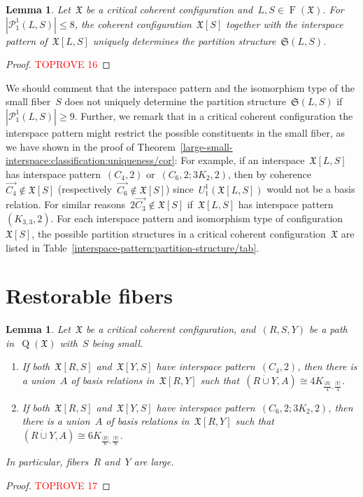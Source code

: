 \documentclass[english,a4paper]{article}
\theoremstyle{plain}
\newtheorem{lemma}      [theorem]{Lemma}
\theoremstyle{definition}
\newcommand{\abs}[1]{| #1 |}
\newcommand{\disjointUnion}{\ensuremath{\mathbin{\dot{\cup}}}}
\DeclareMathOperator{\Fibers}{F}
\newcommand{\coherentConfig}{\ensuremath{\mathfrak{X}}}
\newcommand{\fibers}[1]{\ensuremath{\Fibers \left( #1 \right)}}
\newcommand{\interspace}[2]{\ensuremath{\coherentConfig[#1,#2]}}
\newcommand{\inducedCC}[1]{\ensuremath{\coherentConfig[#1]}}
\newcommand{\arcs}{\ensuremath{A}}
\DeclareMathOperator*{\Quotient}{Q}
\newcommand{\quotientGraph}[1]{\ensuremath{\Quotient(#1)}}
\newcommand{\partition}[1]{\ensuremath{\mathcal{P}^1_1(#1)}}
\newcommand{\partitionStructure}[1]{\ensuremath{\mathfrak{S}(#1)}}
\newcommand{\ipfourCycle}   {\ensuremath{(\cycle{4},2)}}
\newcommand{\ipsixMatchingAndCycle}     {\ensuremath{(\cycle{6},2;\disjointCliques{3}{2},2)}}
\newcommand{\ipsixTriangleComplement}     {\ensuremath{(\clique{3,3},2)}}
\newcommand{\clique}[1]{\ensuremath{K_{#1}}}
\newcommand{\cycle}[1]{\ensuremath{C_{#1}}}
\newcommand{\disjointCliques}[2]{\ensuremath{#1 \clique{#2}}}
\begin{document}
\begin{lemma}
\label{interspace-pattern:partition-structure/lem}
    Let~$\coherentConfig$ be a critical coherent configuration and~$L,S \in \fibers{\coherentConfig}$.
    For~$|\partition{L,S}| \leq 8$, the coherent configuration~$\inducedCC{S}$ together with the interspace pattern of~$\interspace{L}{S}$ uniquely determines the partition structure~$\partitionStructure{L,S}$.
\end{lemma}
\begin{proof}\textcolor{red}{TOPROVE 16}\end{proof}


We should comment that the interspace pattern and the isomorphism type of the small fiber~$S$ does not uniquely determine the partition structure~$\partitionStructure{L,S}$ if~$|\partition{L,S}| \geq 9$.
Further, we remark that in a critical coherent configuration the interspace pattern might restrict the possible constituents in the small fiber, as we have shown in the proof of Theorem~\ref{large-small-interspace:classification:uniqueness/cor}:
For example, if an interspace~$\interspace{L}{S}$ has interspace pattern~$\ipfourCycle$ or~$\ipsixMatchingAndCycle$, then by coherence~$\overrightarrow{C_4} \notin \inducedCC{S}$ (respectively~$\overrightarrow{C_6} \notin \inducedCC{S}$) since~$U^1_1(\interspace{L}{S})$ would not be a basis relation.
For similar reasons~$2\overrightarrow{C_3} \notin \inducedCC{S}$ if~$\interspace{L}{S}$ has interspace pattern~$\ipsixTriangleComplement$.
For each interspace pattern and isomorphism type of configuration~$\inducedCC{S}$, the possible partition structures in a critical coherent configuration~$\coherentConfig$ are listed in Table~\ref{interspace-pattern:partition-structure/tab}.
     

\section{Restorable fibers}
\label{critical:restorable/sec}


\begin{lemma}
    \label{critical:adjacent-interspace-cycle/lem}
    Let~$\coherentConfig$ be a critical coherent configuration, and~$(R,S,Y)$ be a path in~$\quotientGraph{\coherentConfig}$ with~$S$ being small.
    \begin{enumerate}
        \item If both~$\interspace{R}{S}$ and~$\interspace{Y}{S}$ have interspace pattern~$\ipfourCycle$, then there is a union~$\arcs$ of basis relations in~$\interspace{R}{Y}$ such that~$(R \disjointUnion Y,\arcs) \cong \disjointCliques{4}{\frac{\abs{R}}{4},\frac{\abs{Y}}{4}}$.
        \item If both~$\interspace{R}{S}$ and~$\interspace{Y}{S}$ have interspace pattern~$\ipsixMatchingAndCycle$, then there is a union~$\arcs$ of basis relations in~$\interspace{R}{Y}$ such that $(R \disjointUnion Y,\arcs) \cong \disjointCliques{6}{\frac{\abs{R}}{6},\frac{\abs{Y}}{6}}$.
    \end{enumerate}
    In particular, fibers~$R$ and~$Y$ are large.
\end{lemma}
\begin{proof}\textcolor{red}{TOPROVE 17}\end{proof}
\end{document}
